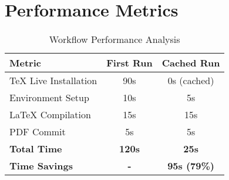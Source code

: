 \documentclass[12pt,a4paper,twoside]{article}
\theoremstyle{definition}
\begin{document}
\appendix

\section{Performance Metrics}

\begin{table}[H]
\centering
\caption{Workflow Performance Analysis}
\begin{tabular}{@{}lcc@{}}
\toprule
\textbf{Metric} & \textbf{First Run} & \textbf{Cached Run} \\
\midrule
TeX Live Installation & 90s & 0s (cached) \\
Environment Setup & 10s & 5s \\
LaTeX Compilation & 15s & 15s \\
PDF Commit & 5s & 5s \\
\textbf{Total Time} & \textbf{120s} & \textbf{25s} \\
\textbf{Time Savings} & \textbf{-} & \textbf{95s (79\%)} \\
\bottomrule
\end{tabular}
\end{table}
\end{document}
